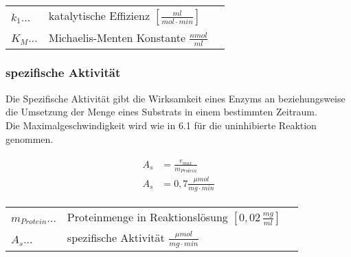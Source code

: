 \begin{table}[H]
  \begin{tabular}{lll}
    $k_{1}$...& katalytische Effizienz $[\frac{ml}{mol \cdot min}]$ & \\
    $K_M$... & Michaelis-Menten Konstante $\frac{nmol}{ml}$ \\
  \end{tabular}
\end{table}

\subsubsection{spezifische Aktivität}
Die Spezifische Aktivität gibt die Wirksamkeit eines Enzyms an beziehungsweise die Umsetzung der Menge eines Substrats in einem bestimmten Zeitraum. \\
Die Maximalgeschwindigkeit wird wie in 6.1 für die uninhibierte Reaktion genommen. 

\begin{align}
  \begin{split} 
    A_s &= \frac{v_{max}}{m_{Protein}} \\
    A_s &= 0,7 \frac{\mu mol}{mg \cdot min}
  \end{split}
\end{align}

\begin{table}[H]
  \begin{tabular}{lll}
    $m_{Protein}$...& Proteinmenge in Reaktionslösung $[0,02 \, \frac{mg}{ml}]$ & \\
    $A_s$... & spezifische Aktivität $\frac{\mu mol}{mg \cdot min}$ \\
  \end{tabular}
\end{table}